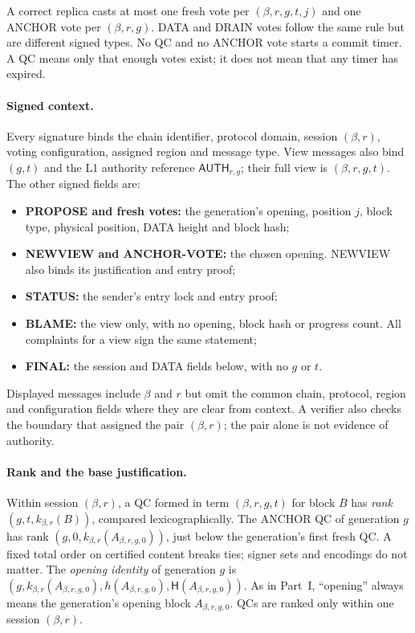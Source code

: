 \documentclass[11pt,a4paper]{article}
\newcommand{\Hash}{\mathsf H}
\newcommand{\tagg}[1]{\ensuremath{\mathsf{#1}}}
\newcommand{\defterm}[1]{\textcolor{rrBlue}{\textit{#1}}}
\newcounter{protocol}
\begin{document}
A correct replica casts at most one fresh vote per $(\beta,r,g,t,j)$ and
one ANCHOR vote per $(\beta,r,g)$. DATA and DRAIN votes follow the same
rule but are different signed types. No QC and no ANCHOR vote starts a
commit timer. A QC means only that enough votes exist; it does not mean
that any timer has expired.

\paragraph{Signed context.}
Every signature binds the chain identifier, protocol domain, session
$(\beta,r)$, voting configuration, assigned region and message type.
View messages also bind $(g,t)$ and the L1 authority reference
$\tagg{AUTH}_{r,g}$; their full view is $(\beta,r,g,t)$. The other
signed fields are:
\begin{itemize}
\item \textbf{PROPOSE and fresh votes:} the generation's opening,
position $j$, block type, physical position, DATA height and block hash;
\item \textbf{NEWVIEW and ANCHOR-VOTE:} the chosen opening. NEWVIEW
also binds its justification and entry proof;
\item \textbf{STATUS:} the sender's entry lock and entry proof;
\item \textbf{BLAME:} the view only, with no opening, block hash or
progress count. All complaints for a view sign the same statement;
\item \textbf{FINAL:} the session and DATA fields below, with no $g$ or $t$.
\end{itemize}
Displayed messages include $\beta$ and $r$ but omit the common chain,
protocol, region and configuration fields where they are clear from
context. A verifier also checks the boundary that assigned the pair
$(\beta,r)$; the pair alone is not evidence of authority.

\paragraph{Rank and the base justification.}
Within session $(\beta,r)$, a QC formed in term $(\beta,r,g,t)$ for block
$B$ has \defterm{rank} $(g,t,k_{\beta,r}(B))$, compared lexicographically.
The ANCHOR QC of generation $g$ has rank $(g,0,k_{\beta,r}(A_{\beta,r,g,0}))$,
just below the generation's first fresh QC. A fixed total order on
certified content breaks ties; signer sets and encodings do not matter.
The \defterm{opening identity} of generation $g$ is
$(g,k_{\beta,r}(A_{\beta,r,g,0}),h(A_{\beta,r,g,0}),\Hash(A_{\beta,r,g,0}))$.
As in Part~I, ``opening'' always means the generation's opening block
$A_{\beta,r,g,0}$. QCs are ranked only within one session $(\beta,r)$.
\end{document}
